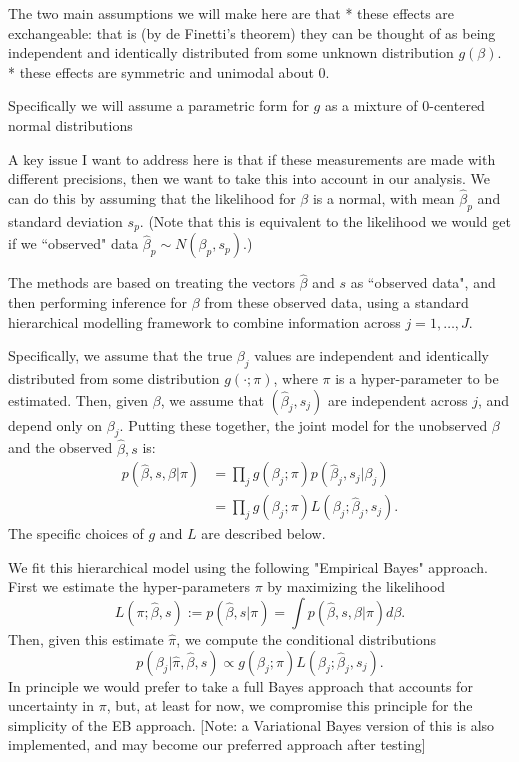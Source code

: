 \documentclass[10pt]{article}
\begin{document}
 The two main assumptions we will make here are that 
* these effects are exchangeable: that is (by de Finetti's theorem) they can be
thought of as being independent and identically distributed from some unknown distribution $g(\beta)$. 
* these effects are symmetric and unimodal about 0.


Specifically we will assume a parametric form for $g$
as a mixture of 0-centered normal distributions

A key issue I want to address here is that if these measurements are made with different precisions, then we want to
take this into account in our analysis.
We can do this by assuming that the likelihood for $\beta$ is a normal, with mean $\hat\beta_p$ and standard deviation $s_p$. (Note that this is equivalent to the likelihood we would get
if we ``observed" data $\hat\beta_p \sim N(\beta_p, s_p)$.)

The methods are based on treating the vectors $\hat\beta$
and $s$ as ``observed data", and then performing inference for $\beta$ from these observed data, using a standard hierarchical modelling framework
to combine information across $j=1,\dots,J$.

Specifically, 
we assume that the true 
$\beta_j$ values are independent
and identically distributed from some distribution $g(\cdot ; \pi)$, where $\pi$ is a hyper-parameter to be estimated. 
Then, given $\beta$, we assume that $(\hat\beta_j,s_j)$ are independent across $j$, and depend only on $\beta_j$. Putting these together, the joint model for the unobserved $\beta$ and the observed $\hat\beta, s$ is:
\begin{align}
p(\hat\beta, s, \beta | \pi) & = \prod_j g(\beta_j ; \pi) p(\hat\beta_j, s_j | \beta_j) \\
& = \prod_j g(\beta_j ; \pi) L(\beta_j; \hat\beta_j,s_j).
\end{align}
The specific choices of $g$ and $L$ are described below.

We fit this hierarchical model using the following "Empirical Bayes" approach. First we estimate the hyper-parameters $\pi$ by maximizing the likelihood
$$L(\pi; \hat\beta, s) := p(\hat\beta, s | \pi) = \int p(\hat\beta, s, \beta | \pi) d\beta.$$
Then, given this estimate $\hat\pi$, we compute the conditional distributions $$p(\beta_j | \hat\pi, \hat\beta, s) \propto g(\beta_j; \pi) L(\beta_j; \hat\beta_j, s_j).$$ 
In principle we would
prefer to take a full Bayes approach that accounts for uncertainty in $\pi$, but, at least for now, we compromise this principle for the simplicity of the EB approach.
[Note: a Variational Bayes version of this is
also implemented, and may become our preferred approach
after testing]
\end{document}

